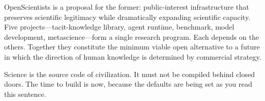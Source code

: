 \documentclass[11pt]{article}
\begin{document}
OpenScientists is a proposal for the former: public-interest infrastructure that preserves scientific legitimacy while dramatically expanding scientific capacity. Five projects---tacit-knowledge library, agent runtime, benchmark, model development, metascience---form a single research program. Each depends on the others. Together they constitute the minimum viable open alternative to a future in which the direction of human knowledge is determined by commercial strategy.

Science is the source code of civilization. It must not be compiled behind closed doors. The time to build is now, because the defaults are being set as you read this sentence.



\end{document}
